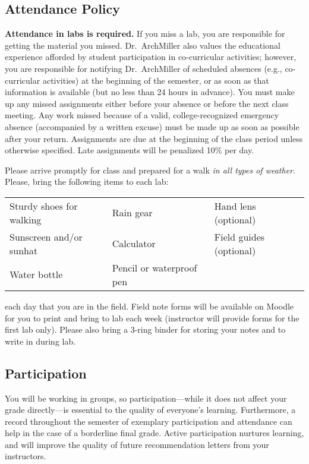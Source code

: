 \documentclass{tufte-handout}
\begin{document}
\begin{fullwidth}
\section{Attendance Policy}

\textbf{Attendance in labs is required.} If you miss a lab, you are responsible for getting the material you missed. Dr.~ArchMiller also values the educational experience afforded by student participation in co-curricular activities; however, you are responsible for notifying Dr.~ArchMiller of scheduled absences (e.g., co-curricular activities) at the beginning of the semester, or as soon as that information is available (but no less than 24 hours in advance). You must make up any missed assignments either before your absence or before the next class meeting. Any work missed because of a valid, college-recognized emergency absence (accompanied by a written excuse) must be made up as soon as possible after your return. Assignments are due at the beginning of the class period unless otherwise specified. Late assignments will be penalized 10\% per day.

 Please arrive promptly for class and prepared for a walk \emph{in all types of weather}. Please, bring the following items to each lab:

\begin{tabular}{lll}
Sturdy shoes for walking & Rain gear & Hand lens (optional)\\
Sunscreen and/or sunhat & Calculator & Field guides (optional)\\
Water bottle & Pencil or waterproof pen
\end{tabular}


 each day that you are in the field. Field note forms will be available on Moodle for you to print and bring to lab each week (instructor will provide forms for the first lab only). Please also bring a 3-ring binder for storing your notes and to write in during lab.

\subsection{Participation}

You will be working in groups, so participation---while it does not affect your grade directly---is essential to the quality of everyone's learning. Furthermore, a record throughout the semester of exemplary participation and attendance can help in the case of a borderline final grade. Active participation nurtures learning, and will improve the quality of future recommendation letters from your instructors.  


\end{fullwidth}
\end{document}
